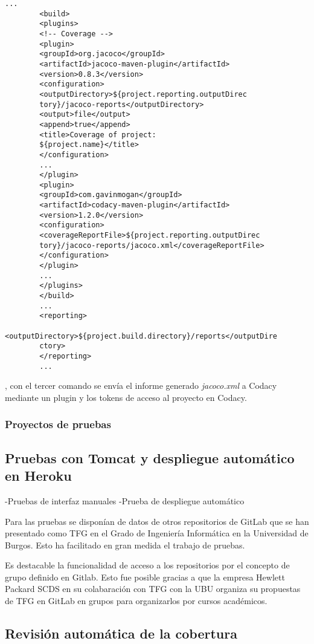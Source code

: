 \begin{minipage}{\linewidth}
	{\tiny
		\begin{lstlisting}[breaklines]
		...
		<build>
		<plugins>
		<!-- Coverage -->
		<plugin>
		<groupId>org.jacoco</groupId>
		<artifactId>jacoco-maven-plugin</artifactId>
		<version>0.8.3</version>
		<configuration>
		<outputDirectory>${project.reporting.outputDirec
		tory}/jacoco-reports</outputDirectory>
		<output>file</output>
		<append>true</append>
		<title>Coverage of project: 
		${project.name}</title>
		</configuration>
		...
		</plugin>
		<plugin>
		<groupId>com.gavinmogan</groupId>
		<artifactId>codacy-maven-plugin</artifactId>
		<version>1.2.0</version>
		<configuration>
		<coverageReportFile>${project.reporting.outputDirec
		tory}/jacoco-reports/jacoco.xml</coverageReportFile>
		</configuration>
		</plugin>
		...
		</plugins>
		</build>	
		...
		<reporting>
		<outputDirectory>${project.build.directory}/reports</outputDire
		ctory>
		</reporting>
		...		
		\end{lstlisting}
	}
\end{minipage}
, con el tercer comando se envía el informe generado \textit{jacoco.xml} a Codacy mediante un plugin y los tokens de acceso al proyecto en Codacy.

\subsubsection{Proyectos de pruebas}

\subsection{Pruebas con Tomcat y despliegue automático en Heroku}

-Pruebas de interfaz manuales
-Prueba de despliegue automático

Para las pruebas se disponían de datos de otros repositorios de GitLab que se han presentado como TFG en el Grado de Ingeniería Informática en la 
Universidad de Burgos. Esto ha facilitado en gran medida el trabajo de pruebas. 

Es destacable la funcionalidad de acceso a los repositorios por el concepto de grupo definido en Gitlab. Esto fue posible gracias a que la empresa Hewlett Packard SCDS en su colabaración con TFG con la UBU organiza su propuestas de TFG en GitLab en grupos para organizarlos por cursos académicos.

\subsection{Revisión automática de la cobertura}

